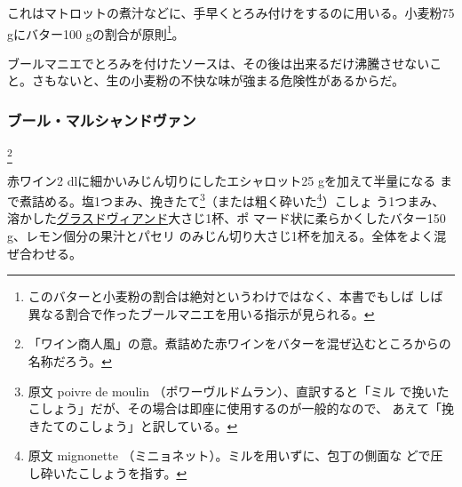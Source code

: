 \begin{recette}


これはマトロットの煮汁などに、手早くとろみ付けをするのに用いる。小麦粉75
gにバター100 gの割合が原則\footnote{このバターと小麦粉の割合は絶対というわけではなく、本書でもしば
  しば異なる割合で作ったブールマニエを用いる指示が見られる。}。

ブールマニエでとろみを付けたソースは、その後は出来るだけ沸騰させないこ
と。さもないと、生の小麦粉の不快な味が強まる危険性があるからだ。

\maeaki

\hypertarget{beurre-marchand-de-vin}{%
\subsubsection{ブール・マルシャンドヴァン}\label{beurre-marchand-de-vin}}

\footnote{「ワイン商人風」の意。煮詰めた赤ワインをバターを混ぜ込むところからの名称だろう。}


赤ワイン2 dlに細かいみじん切りにしたエシャロット25 gを加えて半量になる
まで煮詰める。塩1つまみ、挽きたて\footnote{原文 poivre de moulin
  （ポワーヴルドムラン）、直訳すると「ミル
  で挽いたこしょう」だが、その場合は即座に使用するのが一般的なので、
  あえて「挽きたてのこしょう」と訳している。}（または粗く砕いた\footnote{原文
  mignonette （ミニョネット）。ミルを用いずに、包丁の側面な
  どで圧し砕いたこしょうを指す。}）こしょ
う1つまみ、溶かした\protect\hyperlink{glace-de-viande}{グラスドヴィアンド}大さじ1杯、ポ
マード状に柔らかくしたバター150 g、レモン\unquart{}個分の果汁とパセリ
のみじん切り大さじ1杯を加える。全体をよく混ぜ合わせる。


\end{recette}
